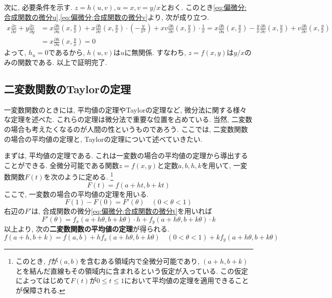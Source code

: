 \documentclass[a4j,dvipdfmx]{jsarticle}
\numberwithin{equation}{section}
\begin{document}
            次に, 必要条件を示す. $z=h(u,v),u=x,v=y/x$とおく. このとき\eqref{eq:偏微分:合成関数の微分u},\eqref{eq:偏微分:合成関数の微分v}より, 次が成り立つ.
            \begin{align*}
                x\frac{\partial z}{\partial x}+y\frac{\partial z}{\partial y}&=x\frac{\partial h}{\partial u}\left(x,\frac{y}{x}\right)+x\frac{\partial h}{\partial v}\left(x,\frac{y}{x}\right)\cdot \left(-\frac{y}{x^2}\right)+xv\frac{\partial h}{\partial v}\left(x,\frac{y}{x}\right)\cdot \frac{1}{x}=x\frac{\partial h}{\partial u}\left(x,\frac{y}{x}\right)-\frac{y}{x}\frac{\partial h}{\partial v}\left(x,\frac{y}{x}\right)+v\frac{\partial h}{\partial v}\left(x,\frac{y}{x}\right)\\
                &=x\frac{\partial h}{\partial u}\left(x,\frac{y}{x}\right)=0
            \end{align*}
            よって, $h_u=0$であるから, $h(u,v)$は$u$に無関係. すなわち, $z=f(x,y)$は$y/x$のみの関数である.
            以上で証明完了.
        \clearpage
        \subsection{二変数関数のTaylorの定理}
            一変数関数のときには, 平均値の定理やTaylorの定理など, 微分法に関する様々な定理を述べた. これらの定理は微分法で重要な位置を占めている. 当然, 二変数の場合も考えたくなるのが人間の性というものであろう. 
            ここでは, 二変数関数の場合の平均値の定理と, Taylorの定理について述べていきたい.

            まずは, 平均値の定理である. これは一変数の場合の平均値の定理から導出することができる. 全微分可能である関数$z=f(x,y)$と定数$a,b,h,k$を用いて, 一変数関数$F(t)$を次のように定める.
            \footnote{このとき, $f$が$(a,b)$を含むある領域内で全微分可能であり, $(a+h,b+k)$とを結んだ直線もその領域内に含まれるという仮定が入っている. この仮定によってはじめて$F(t)$が$0\leq t\leq 1$において平均値の定理を適用できることが保障される.}
            \begin{equation*}
                F(t)=f(a+ht,b+kt)
            \end{equation*}
            ここで, 一変数の場合の平均値の定理を用いる.
            \begin{equation*}
                F(1)-F(0)=F'(\theta)\quad(0<\theta<1)
            \end{equation*}
            右辺の$F'$は, 合成関数の微分\eqref{eq:偏微分:合成関数の微分t}を用いれば
            \begin{equation*}
                F'(\theta)=f_x(a+h\theta,b+k\theta)\cdot h+f_y(a+h\theta,b+k\theta)\cdot k
            \end{equation*}
            以上より, 次の\textbf{二変数関数の平均値の定理}が得られる.
            \begin{equation}
                f(a+h,b+k)=f(a,b)+hf_x(a+h\theta,b+k\theta)\quad (0<\theta<1)+kf_y(a+h\theta,b+k\theta) \label{eq:偏微分:二変数関数の平均値の定理}
            \end{equation}
\end{document}

